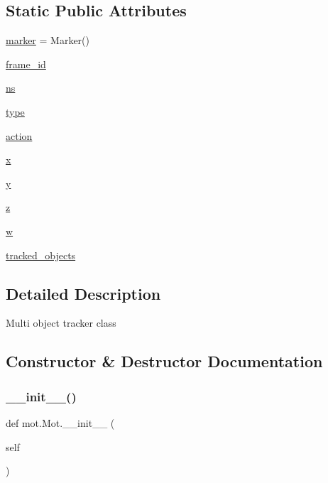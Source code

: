 \subsection*{Static Public Attributes}
\begin{DoxyCompactItemize}
\item 
\hyperlink{classmot_1_1Mot_afa88ed1870c8848b4368fe59d12c9f7f}{marker} = Marker()
\item 
\hyperlink{classmot_1_1Mot_adddddf34ffd1d5e93a4ab67a79416531}{frame\+\_\+id}
\item 
\hyperlink{classmot_1_1Mot_a0918530a3a23816411d3e02de7b58b05}{ns}
\item 
\hyperlink{classmot_1_1Mot_a1c8fd1b60dab0f8df2dff9e9b66996db}{type}
\item 
\hyperlink{classmot_1_1Mot_a9e252c1dac6a069e958f24ec5d2ece06}{action}
\item 
\hyperlink{classmot_1_1Mot_a58647c038e9ef54cc10eb37be08d340c}{x}
\item 
\hyperlink{classmot_1_1Mot_a80b2443ae75a50bf00d568decfaf3068}{y}
\item 
\hyperlink{classmot_1_1Mot_a5c825a78182ddd5d999a5f873cc54191}{z}
\item 
\hyperlink{classmot_1_1Mot_a792c086f8f01b7974e53dda4d88dd27d}{w}
\item 
\hyperlink{classmot_1_1Mot_a1a1a1c16afbcb4552e857568acf9ed11}{tracked\+\_\+objects}
\end{DoxyCompactItemize}


\subsection{Detailed Description}
\begin{DoxyVerb}Multi object tracker class\end{DoxyVerb}
 

\subsection{Constructor \& Destructor Documentation}
\mbox{\label{classmot_1_1Mot_a63d1ea755e2c380d5d8830862874b56a}} 
\subsubsection{\texorpdfstring{\+\_\+\+\_\+init\+\_\+\+\_\+()}{\_\_init\_\_()}}
{\footnotesize\ttfamily def mot.\+Mot.\+\_\+\+\_\+init\+\_\+\+\_\+ (\begin{DoxyParamCaption}\item[{}]{self }\end{DoxyParamCaption})}



